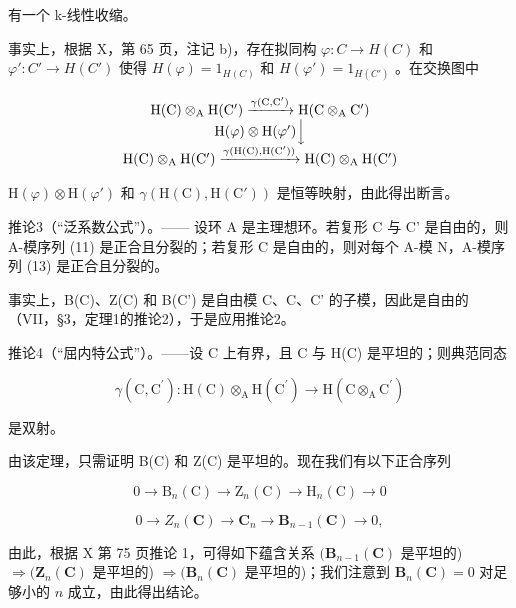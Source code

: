 有一个 k-线性收缩。

事实上，根据 X，第 65 页，注记 b)，存在拟同构 \(\varphi: C \to H(C)\) 和 \(\varphi': C' \to H(C')\) 使得 \(H(\varphi) = 1_{H(C)}\) 和 \(H(\varphi') = 1_{H(C')}\) 。在交换图中

\[
\begin{array}{c} \mathrm{H(C)} \otimes_ {\mathrm{A}} \mathrm {H(C^ {\prime})} \xrightarrow {\gamma (\mathrm{C,C} ^ {\prime})} \mathrm {H(C} \otimes_ {\mathrm{A}} \mathrm {C^ {\prime})} \\ \mathrm {H}(\varphi) \otimes \mathrm {H}(\varphi^ {\prime}) \Big \downarrow \\ \mathrm {H(C)} \otimes_ {\mathrm{A}} \mathrm {H(C^ {\prime})} \xrightarrow {\gamma (\mathrm{H(C),H(C^ {\prime})})} \mathrm {H(C)} \otimes_ {\mathrm{A}} \mathrm {H(C^ {\prime})} \end{array}
\]

\(\mathrm{H}(\varphi) \otimes \mathrm{H}(\varphi') \text{ 和 } \gamma(\mathrm{H}(\mathrm{C}), \mathrm{H}(\mathrm{C}') ) \text{ 是恒等映射，由此得出断言。}\)

推论3（“泛系数公式”）。—— 设环 A 是主理想环。若复形 C 与 C' 是自由的，则 A-模序列 (11) 是正合且分裂的；若复形 C 是自由的，则对每个 A-模 N，A-模序列 (13) 是正合且分裂的。

事实上，B(C)、Z(C) 和 B(C') 是自由模 C、C、C' 的子模，因此是自由的（VII，§3，定理1的推论2），于是应用推论2。

推论4（“屈内特公式”）。——设 C 上有界，且 C 与 H(C) 是平坦的；则典范同态

\[
\gamma (\mathrm{C}, \mathrm{C} ^ {\prime}): \mathrm{H} (\mathrm{C}) \otimes_ {\mathrm{A}} \mathrm{H} (\mathrm{C} ^ {\prime}) \rightarrow \mathrm{H} (\mathrm{C} \otimes_ {\mathrm{A}} \mathrm{C} ^ {\prime})
\]

是双射。

由该定理，只需证明 B(C) 和 Z(C) 是平坦的。现在我们有以下正合序列

\[
0 \to \mathrm{B} _ {n} (\mathrm{C}) \to \mathrm{Z} _ {n} (\mathrm{C}) \to \mathrm{H} _ {n} (\mathrm{C}) \to 0
\]

\[
0 \to Z _ {n} (\mathbf {C}) \to \mathbf {C} _ {n} \to \mathbf {B} _ {n - 1} (\mathbf {C}) \to 0,
\]

由此，根据 X 第 75 页推论 1，可得如下蕴含关系 \((\mathbf{B}_{n-1}(\mathbf{C})\) 是平坦的) \(\Rightarrow (\mathbf{Z}_n(\mathbf{C})\) 是平坦的) \(\Rightarrow (\mathbf{B}_n(\mathbf{C})\) 是平坦的)；我们注意到 \(\mathbf{B}_n(\mathbf{C}) = 0\) 对足够小的 \(n\) 成立，由此得出结论。

